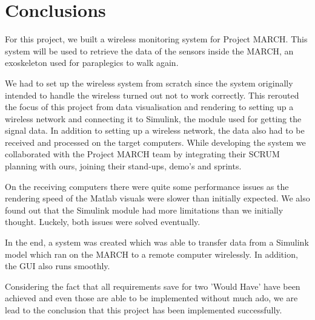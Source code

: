 \chapter{Conclusions}
\label{ch:con}
For this project, we built a wireless monitoring system for Project MARCH. This system will be used to retrieve the data of the sensors inside the MARCH, an exoskeleton used for paraplegics to walk again.

We had to set up the wireless system from scratch since the system originally intended to handle the wireless turned out not to work correctly. This rerouted the focus of this project from data visualisation and rendering to setting up a wireless network and connecting it to Simulink, the module used for getting the signal data. In addition to setting up a wireless network, the data also had to be received and processed on the target computers. While developing the system we collaborated with the Project MARCH team by integrating their SCRUM planning with ours, joining their stand-ups, demo's and sprints.

On the receiving computers there were quite some performance issues as the rendering speed of the Matlab visuals were slower than initially expected. We also found out that the Simulink module had more limitations than we initially thought. Luckely, both issues were solved eventually.

In the end, a system was created which was able to transfer data from a Simulink model which ran on the MARCH to a remote computer wirelessly. In addition, the GUI also runs smoothly. 

Considering the fact that all requirements save for two 'Would Have' have been achieved and even those are able to be implemented without much ado, we are lead to the conclusion that this project has been implemented successfully.  